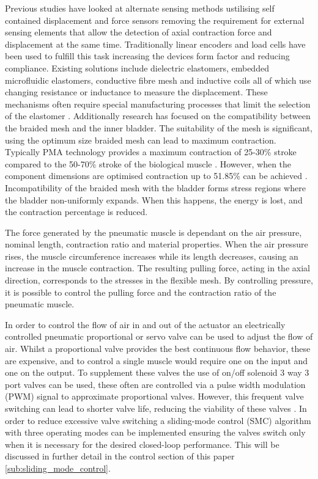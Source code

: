 \documentclass[11pt,a4paper]{article}
\begin{document}
Previous studies have looked at alternate sensing methods ustilising self contained displacement and force sensors removing the requirement for external sensing elements that allow the detection of axial contraction force and displacement at the same time. Traditionally linear encoders and load cells have been used to fulfill this task increasing the devices form factor and reducing compliance. Existing solutions include dielectric elastomers, embedded microfluidic elastomers, conductive fibre mesh and inductive coils all of which use changing resistance or inductance to measure the displacement. These mechanisms often require special manufacturing processes that limit the selection of the elastomer \cite{erin_pol_valle_park_2016}. 
Additionally research has focused on the compatibility between the braided mesh and the inner bladder. The suitability of the mesh is significant, using the optimum size braided mesh can lead to maximum contraction. Typically PMA technology provides a maximum contraction of 25-30\% stroke compared to the 50-70\% stroke of the biological muscle \cite{andrikopoulos_nikolakopoulos_2017}. However, when the component dimensions are optimised contraction up to 51.85\% can be achieved \cite{najmuddin_mustaffa_2017}. Incompatibility of the braided mesh with the bladder forms stress regions where the bladder non-uniformly expands. When this happens, the energy is lost, and the contraction percentage is reduced. \newline

The force generated by the pneumatic muscle is dependant on the air pressure, nominal length, contraction ratio and material properties. When the air pressure rises, the muscle circumference increases while its length decreases, causing an increase in the muscle contraction. The resulting pulling force, acting in the axial direction, corresponds to the stresses in the flexible mesh. By controlling pressure, it is possible to control the pulling force and the contraction ratio of the pneumatic muscle. \newline

In order to control the flow of air in and out of the actuator an electrically controlled pneumatic proportional or servo valve can be used to adjust the flow of air. Whilst a proportional valve provides the best continuous flow behavior, these are expensive, and to control a single muscle would require one on the input and one on the output. To supplement these valves the use of on/off solenoid 3 way 3 port valves can be used, these often are controlled via a pulse width modulation (PWM) signal to approximate proportional valves. However, this frequent valve switching can lead to shorter valve life, reducing the viability of these valves \cite{zhang_bone_2018}. In order to reduce excessive valve switching a sliding-mode control (SMC) algorithm with three operating modes can be implemented ensuring the valves switch only when it is necessary for the desired closed-loop performance. This will be discussed in further detail in the control section of this paper \ref{sub:sliding_mode_control}. \newline
\end{document}
